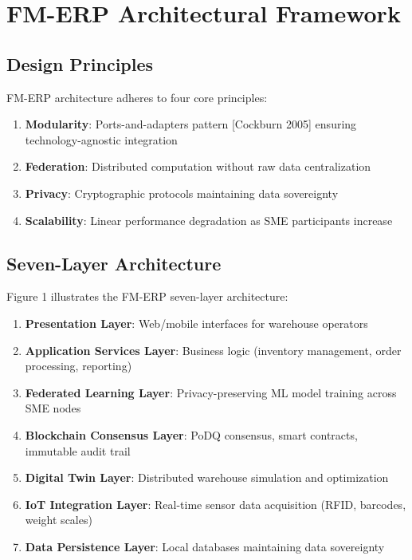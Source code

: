\documentclass[times,10pt,twocolumn]{jucs2e}
\begin{document}
\section{FM-ERP Architectural Framework}

\subsection{Design Principles}

FM-ERP architecture adheres to four core principles:

\begin{enumerate}
\item \textbf{Modularity}: Ports-and-adapters pattern [Cockburn 2005] ensuring technology-agnostic integration
\item \textbf{Federation}: Distributed computation without raw data centralization
\item \textbf{Privacy}: Cryptographic protocols maintaining data sovereignty
\item \textbf{Scalability}: Linear performance degradation as SME participants increase
\end{enumerate}

\subsection{Seven-Layer Architecture}

Figure 1 illustrates the FM-ERP seven-layer architecture:

\begin{enumerate}
\item \textbf{Presentation Layer}: Web/mobile interfaces for warehouse operators
\item \textbf{Application Services Layer}: Business logic (inventory management, order processing, reporting)
\item \textbf{Federated Learning Layer}: Privacy-preserving ML model training across SME nodes
\item \textbf{Blockchain Consensus Layer}: PoDQ consensus, smart contracts, immutable audit trail
\item \textbf{Digital Twin Layer}: Distributed warehouse simulation and optimization
\item \textbf{IoT Integration Layer}: Real-time sensor data acquisition (RFID, barcodes, weight scales)
\item \textbf{Data Persistence Layer}: Local databases maintaining data sovereignty
\end{enumerate}
\end{document}
